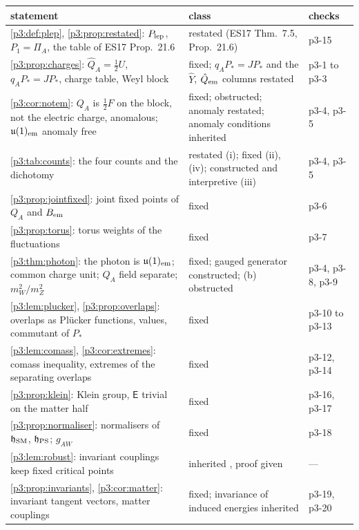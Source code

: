 \begin{table}[t]
\centering
\footnotesize
\begin{tabular}{@{}>{\raggedright\arraybackslash}p{8.4cm}>{\raggedright\arraybackslash}p{4.3cm}>{\raggedright\arraybackslash}p{2.2cm}@{}}
\toprule
statement & class & checks\\
\midrule
\cref{p3:def:plep}, \cref{p3:prop:restated}: $P_{\rm lep}$, $P_1=\Pi_A$, the table of ES17 Prop.~21.6 & restated (ES17 Thm.~7.5, Prop.~21.6) & p3-15\\
\cref{p3:prop:charges}: $\hat Q_A=\tfrac12U$, $q_AP_*=JP_*$, charge table, Weyl block & fixed; $q_AP_*=JP_*$ and the $\hat Y$, $\hat Q_{\rm em}$ columns restated & p3-1 to p3-3\\
\cref{p3:cor:notem}: $Q_A$ is $\tfrac12F$ on the block, not the electric charge, anomalous; $\mathfrak{u}(1)_{\rm em}$ anomaly free & fixed; obstructed; anomaly restated; anomaly conditions inherited & p3-4, p3-5\\
\cref{p3:tab:counts}: the four counts and the dichotomy & restated (i); fixed (ii), (iv); constructed and interpretive (iii) & p3-4, p3-5\\
\cref{p3:prop:jointfixed}: joint fixed points of $Q_A$ and $B_{\rm em}$ & fixed & p3-6\\
\cref{p3:prop:torus}: torus weights of the fluctuations & fixed & p3-7\\
\cref{p3:thm:photon}: the photon is $\mathfrak{u}(1)_{\rm em}$; common charge unit; $Q_A$ field separate; $m_W^2/m_Z^2$ & fixed; gauged generator constructed; (b) obstructed & p3-4, p3-8, p3-9\\
\cref{p3:lem:plucker}, \cref{p3:prop:overlaps}: overlaps as Plücker functions, values, commutant of $P_*$ & fixed & p3-10 to p3-13\\
\cref{p3:lem:comass}, \cref{p3:cor:extremes}: comass inequality, extremes of the separating overlaps & fixed & p3-12, p3-14\\
\cref{p3:prop:klein}: Klein group, $\mathsf E$ trivial on the matter half & fixed & p3-16, p3-17\\
\cref{p3:prop:normaliser}: normalisers of $\mathfrak h_{\rm SM}$, $\mathfrak h_{\rm PS}$; $g_{AW}$ & fixed & p3-18\\
\cref{p3:lem:robust}: invariant couplings keep fixed critical points & inherited \cite{Michel71,Palais79}, proof given & ---\\
\cref{p3:prop:invariants}, \cref{p3:cor:matter}: invariant tangent vectors, matter couplings & fixed; invariance of induced energies inherited & p3-19, p3-20\\

\end{tabular}
\end{table}
